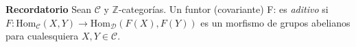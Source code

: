 \documentclass[preview]{standalone}
\begin{document}
\begin{center}
\flushleft \textbf{Recordatorio} Sean $\mathscr{C}$ y  $\mathbb{Z}$-categorías. Un funtor (covariante) F:\to{} es \emph{aditivo} si $F:\text{Hom}_\mathscr{C}(X,Y)\to \text{Hom}_\mathscr{D}(F(X), F(Y))$ es un morfismo de grupos abelianos para cualesquiera $X,Y\in\mathscr{C}$.
\end{center}
\end{document}

